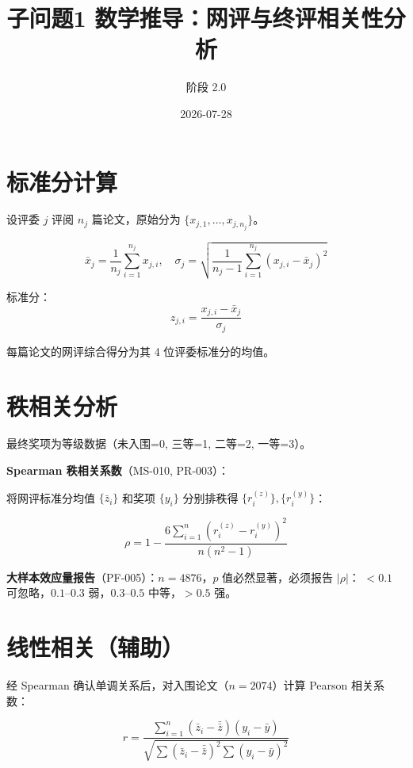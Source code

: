 \documentclass[UTF8]{ctexart}
\title{子问题1 数学推导：网评与终评相关性分析}
\author{阶段 2.0}
\date{2026-07-28}
\begin{document}
\maketitle

\section{标准分计算}

设评委 $j$ 评阅 $n_j$ 篇论文，原始分为 $\{x_{j,1}, \ldots, x_{j,n_j}\}$。

\begin{equation}
\bar{x}_j = \frac{1}{n_j}\sum_{i=1}^{n_j} x_{j,i}, \quad
\sigma_j = \sqrt{\frac{1}{n_j-1}\sum_{i=1}^{n_j}(x_{j,i} - \bar{x}_j)^2}
\end{equation}

标准分：
\begin{equation}
z_{j,i} = \frac{x_{j,i} - \bar{x}_j}{\sigma_j}
\end{equation}

每篇论文的网评综合得分为其 4 位评委标准分的均值。

\section{秩相关分析}

最终奖项为等级数据（未入围=0, 三等=1, 二等=2, 一等=3）。

\textbf{Spearman 秩相关系数}（MS-010, PR-003）：

将网评标准分均值 $\{\bar{z}_i\}$ 和奖项 $\{y_i\}$ 分别排秩得 $\{r_i^{(z)}\}, \{r_i^{(y)}\}$：

\begin{equation}
\rho = 1 - \frac{6\sum_{i=1}^{n}(r_i^{(z)} - r_i^{(y)})^2}{n(n^2-1)}
\end{equation}

\textbf{大样本效应量报告}（PF-005）：$n = 4876$，$p$ 值必然显著，必须报告 $|\rho|$：
$<0.1$ 可忽略，$0.1$–$0.3$ 弱，$0.3$–$0.5$ 中等，$>0.5$ 强。

\section{线性相关（辅助）}

经 Spearman 确认单调关系后，对入围论文（$n=2074$）计算 Pearson 相关系数：

\begin{equation}
r = \frac{\sum_{i=1}^{n}(\bar{z}_i - \bar{\bar{z}})(y_i - \bar{y})}{\sqrt{\sum(\bar{z}_i - \bar{\bar{z}})^2 \sum(y_i - \bar{y})^2}}
\end{equation}
\end{document}
